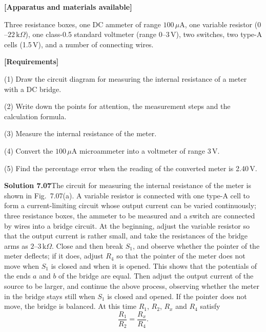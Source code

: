 \textbf{[Apparatus and materials available]}

Three resistance boxes, one DC ammeter of range $100\,\mu$A, one variable resistor ($0$--$22\,\mathrm{k}\Omega$), one class-0.5 standard voltmeter (range $0$--$3$\,V), two switches, two type-A cells (1.5\,V), and a number of connecting wires.

\textbf{[Requirements]}

(1) Draw the circuit diagram for measuring the internal resistance of a meter with a DC bridge.

(2) Write down the points for attention, the measurement steps and the calculation formula.

(3) Measure the internal resistance of the meter.

(4) Convert the $100\,\mu$A microammeter into a voltmeter of range 3\,V.

(5) Find the percentage error when the reading of the converted meter is 2.40\,V.

\textbf{Solution 7.07}\quad The circuit for measuring the internal resistance of the meter is shown in Fig.~7.07(a). A variable resistor is connected with one type-A cell to form a current-limiting circuit whose output current can be varied continuously; three resistance boxes, the ammeter to be measured and a switch are connected by wires into a bridge circuit. At the beginning, adjust the variable resistor so that the output current is rather small, and take the resistances of the bridge arms as $2$--$3\,\mathrm{k}\Omega$. Close and then break $S_1$, and observe whether the pointer of the meter deflects; if it does, adjust $R_4$ so that the pointer of the meter does not move when $S_1$ is closed and when it is opened. This shows that the potentials of the ends $a$ and $b$ of the bridge are equal. Then adjust the output current of the source to be larger, and continue the above process, observing whether the meter in the bridge stays still when $S_1$ is closed and opened. If the pointer does not move, the bridge is balanced. At this time $R_1$, $R_2$, $R_x$ and $R_4$ satisfy
\[
\frac{R_1}{R_2}=\frac{R_x}{R_4}.
\]

